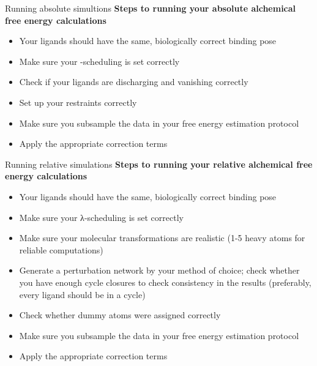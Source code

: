 \documentclass[9pt,bestpractices]{livecoms}
\begin{document}
\begin{Checklists*}[p!]
\begin{checklist}{Running absolute simultions}
        \textbf{Steps to running your absolute alchemical free energy calculations}
\begin{itemize}
 \item Your ligands should have the same, biologically correct binding pose
        \item Make sure your \textlambda-scheduling is set correctly
        \item Check if your ligands are discharging and vanishing correctly
        \item Set up your restraints correctly
        \item Make sure you subsample the data in your free energy estimation protocol
        \item Apply the appropriate correction terms
\end{itemize}
\end{checklist}

\begin{checklist}{Running relative simulations}
        \textbf{Steps to running your relative alchemical free energy calculations}
\begin{itemize}
   \item Your ligands should have the same, biologically correct binding pose
        \item Make sure your λ-scheduling is set correctly
        \item Make sure your molecular transformations are realistic (1-5 heavy atoms for reliable computations)
        \item Generate a perturbation network by your method of choice; check whether you have enough cycle closures to check consistency in the results (preferably, every ligand should be in a cycle)
        \item Check whether dummy atoms were assigned correctly
        \item Make sure you subsample the data in your free energy estimation protocol
        \item Apply the 
        appropriate correction terms
\end{itemize}
\end{checklist}


\end{Checklists*}
\end{document}
